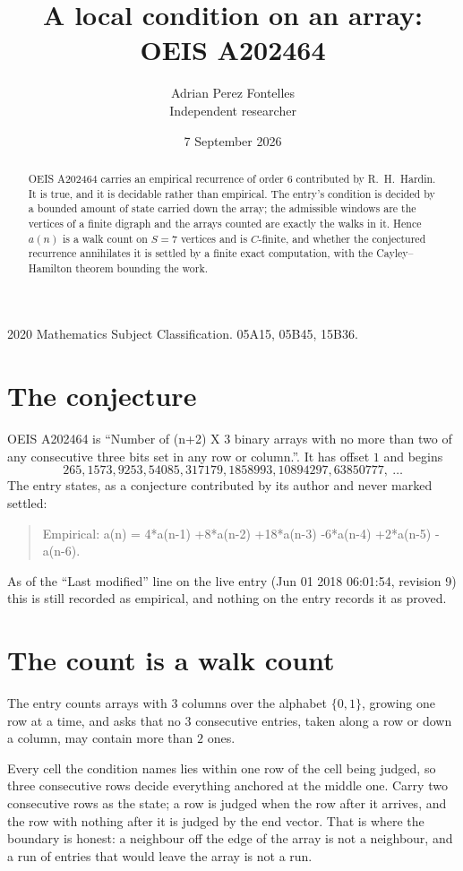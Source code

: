 \documentclass[11pt,a4paper]{article}
\title{A local condition on an array: OEIS A202464}
\author{Adrian Perez Fontelles\\ \small Independent researcher}
\date{7 September 2026}
\theoremstyle{plain}
\theoremstyle{definition}
\begin{document}
\maketitle

\begin{abstract}
OEIS A202464 carries an empirical recurrence of order $6$ contributed by R.~H.~Hardin. It is
true, and it is decidable rather than empirical. The entry's condition is decided by a bounded amount of state carried down the array; the
admissible windows are the vertices of a finite digraph and the arrays counted are exactly the
walks in it. Hence $a(n)$ is a walk count on $S=7$ vertices and is $C$-finite, and whether the
conjectured recurrence annihilates it is settled by a finite exact computation, with the
Cayley--Hamilton theorem bounding the work.
\end{abstract}

\noindent\small 2020 Mathematics Subject Classification. 05A15, 05B45, 15B36.\normalsize

\section{The conjecture}

OEIS A202464 is ``Number of (n+2) X 3 binary arrays with no more than two of any consecutive three bits set in any row or column.''. It has offset $1$ and begins
\[
265, 1573, 9253, 54085, 317179, 1858993, 10894297, 63850777,\ \dots
\]
The entry states, as a conjecture contributed by its author and never marked settled:
\begin{quote}
Empirical: a(n) = 4*a(n-1) +8*a(n-2) +18*a(n-3) -6*a(n-4) +2*a(n-5) -a(n-6).
\end{quote}
As of the ``Last modified'' line on the live entry (Jun 01 2018 06:01:54, revision 9) this is still
recorded as empirical, and nothing on the entry records it as proved.

\section{The count is a walk count}

The entry counts arrays with $3$ columns over the alphabet $\{0,1\}$, growing one row at a time, and asks that no $3$ consecutive entries, taken along a row or down a column, may contain more than $2$ ones.

Every cell the condition names lies within one row of the cell being judged, so three consecutive rows decide everything anchored at the middle one. Carry two consecutive rows as the state; a row is judged when the row after it arrives, and the row with nothing after it is judged by the end vector. That is where the boundary is honest: a neighbour off the edge of the array is not a neighbour, and a run of entries that would leave the array is not a run.
\end{document}
